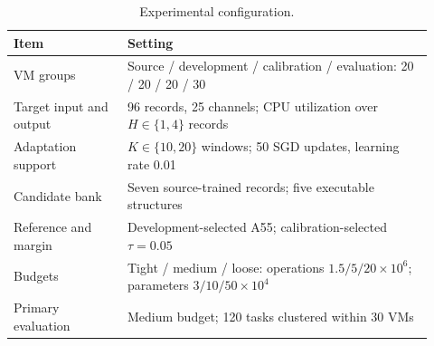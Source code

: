 \begin{table}[pos=!htbp]
\centering\small
\caption{Experimental configuration.}\label{tab:configuration}
\begin{tabular}{p{0.25\linewidth}p{0.67\linewidth}}
\toprule
Item & Setting\\\midrule
VM groups & Source / development / calibration / evaluation: 20 / 20 / 20 / 30\\
Target input and output & 96 records, 25 channels; CPU utilization over $H\in\{1,4\}$ records\\
Adaptation support & $K\in\{10,20\}$ windows; 50 SGD updates, learning rate 0.01\\
Candidate bank & Seven source-trained records; five executable structures\\
Reference and margin & Development-selected A55; calibration-selected $\tau=0.05$\\
Budgets & Tight / medium / loose: operations $1.5/5/20\times10^6$; parameters $3/10/50\times10^4$\\
Primary evaluation & Medium budget; 120 tasks clustered within 30 VMs\\
\bottomrule
\end{tabular}
\end{table}
